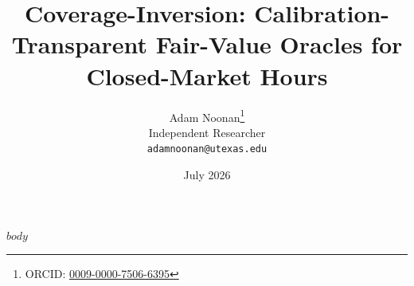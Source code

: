 \documentclass[11pt]{article}
\title{Coverage-Inversion: Calibration-Transparent Fair-Value Oracles for Closed-Market Hours}
\author{
  Adam Noonan\thanks{ORCID: \href{https://orcid.org/0009-0000-7506-6395}{0009-0000-7506-6395}} \\
  Independent Researcher \\
  \texttt{adamnoonan@utexas.edu}
}
\date{July 2026}
\begin{document}
\maketitle

$body$



\end{document}
